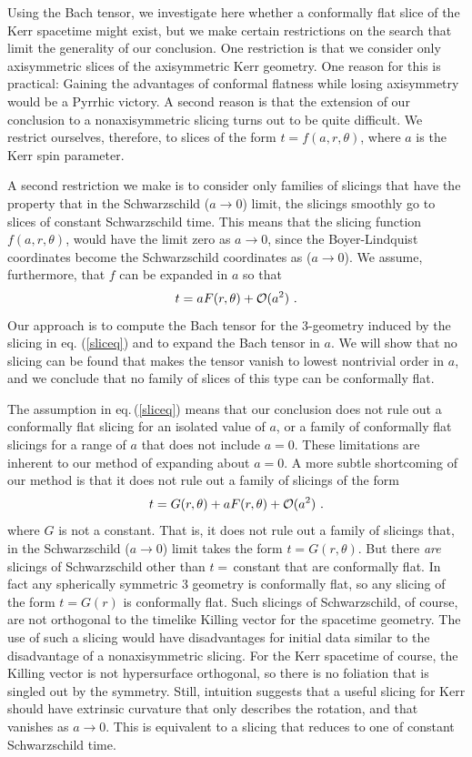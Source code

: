 Using the Bach tensor, we investigate here whether a conformally flat
slice of the Kerr spacetime might exist, but we make certain
restrictions on the search that limit the generality of our
conclusion. One restriction is that we consider only axisymmetric
slices of the axisymmetric Kerr geometry. One reason for this is
practical: Gaining the advantages of conformal flatness while losing
axisymmetry would be a Pyrrhic victory.  A second reason is that the
extension of our conclusion to a nonaxisymmetric slicing turns out to
be quite difficult. We restrict ourselves, therefore, to slices of the
form $t=f(a,r,\theta)$, where $a$ is the Kerr spin parameter.


A second restriction we make is to consider only families of slicings
that have the property that in the Schwarzschild ($a\rightarrow0$)
limit, the slicings smoothly go to slices of constant 
Schwarzschild time. This means that the slicing function
$f(a,r,\theta)$, would have the limit zero as $a\rightarrow0$, since
the Boyer-Lindquist coordinates become the Schwarzschild coordinates
as ($a\rightarrow0$). We assume, furthermore, that $f$ can be expanded
in $a$ so that
\begin{equation}\label{sliceq} 
t=aF(r,\theta)+{\cal O}(a^2)\ .
\end{equation}
Our approach is to compute the Bach tensor for the 3-geometry induced
by the slicing in eq. (\ref{sliceq}) and to expand the Bach tensor in $a$.
We will show that no slicing can be found that makes the tensor vanish
to lowest nontrivial order in $a$, and we conclude that no family of
slices of this type can be conformally flat. 




The assumption in eq.\,(\ref{sliceq}) means that our conclusion does
not rule out  a conformally flat slicing
for an isolated value of $a$, or  a family of conformally
flat slicings for a range of $a$ that does not include $a=0$. These
limitations are inherent to our method of expanding about $a=0$. A more
subtle shortcoming of our method is that it does not rule out a family
of slicings of the form
\begin{equation}\label{gensliceq} 
t=G(r,\theta)+aF(r,\theta)+{\cal O}(a^2)\ .
\end{equation}
where $G$ is not a constant.
That is, it does not rule out a family of slicings that, in the
Schwarzschild ($a\rightarrow0$) limit takes the form $t=G(r,\theta)$.
But there {\em are} slicings of Schwarzschild other than
$t=$\,constant that are conformally flat. In fact any spherically
symmetric 3 geometry is conformally flat, so any slicing of the form
$t=G(r)$ is conformally flat. Such slicings of Schwarzschild, of
course, are not orthogonal to the timelike Killing vector for the
spacetime geometry. The use of such a slicing would have disadvantages
for initial data similar to the disadvantage of a nonaxisymmetric
slicing.  For the Kerr spacetime of course, the Killing vector is not
hypersurface orthogonal, so there is no foliation that is singled out
by the symmetry. Still, intuition suggests that a useful slicing for
Kerr should have extrinsic curvature that only describes the rotation, and
that vanishes as $a\rightarrow0$. This is equivalent to a slicing that 
reduces to one of constant Schwarzschild time.

